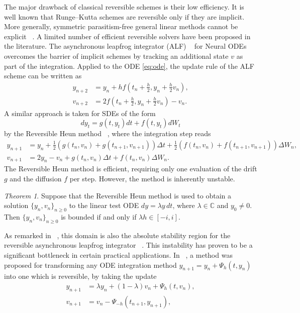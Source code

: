 \documentclass{article} %
\theoremstyle{definition}
\theoremstyle{remark}
\newtheorem{theorem}{Theorem}[section]
\begin{document}
The major drawback of classical reversible schemes is their low efficiency. It is well known that Runge--Kutta schemes are reversible only if they are implicit. More generally, symmetric parasitism-free general linear methods cannot be explicit ~\citep{butcher2016symmetric}. A limited number of efficient reversible solvers have been proposed in the literature. The asynchronous leapfrog integrator (ALF) ~\citep{zhuang2021mali} for Neural ODEs overcomes the barrier of implicit schemes by tracking an additional state $v$ as part of the integration. Applied to the ODE \eqref{eq:ode}, the update rule of the ALF scheme can be written as
\begin{align*}
    y_{n+2} &= y_n + h f\left(t_n + \frac{h}{2}, y_n + \frac{h}{2} v_n\right),\\
    v_{n+2} &=2f\left(t_n + \frac{h}{2}, y_n + \frac{h}{2} v_n\right) - v_n.
\end{align*}
A similar approach is taken for SDEs of the form
\begin{equation}\label{eq:sde}
    dy_t = g(t,y_t)dt + f(t,y_t)dW_t
\end{equation}
by the Reversible Heun method ~\citep{kidger2021efficient}, where the integration step reads
\begin{align*}
    y_{n+1} &= y_n + \frac{1}{2}(g(t_n, v_n) + g(t_{n+1}, v_{n+1})) \Delta t + \frac{1}{2}(f(t_n, v_n) + f(t_{n+1}, v_{n+1})) \Delta W_n,\\
    v_{n+1} &= 2y_n - v_n + g(t_n, v_n) \Delta t + f(t_n, v_n) \Delta W_n.
\end{align*}
The Reversible Heun method is efficient, requiring only one evaluation of the drift $g$ and the diffusion $f$ per step. However, the method is inherently unstable.

\begin{theorem}{\cite[Theorem D.19]{kidger2021efficient}}\label{thm:rev_heun_stability}
    Suppose that the Reversible Heun method is used to obtain a solution $\{y_n, v_n\}_{n \geq 0}$ to the linear test ODE $dy = \lambda y\, dt$, where $\lambda \in \mathbb{C}$ and $y_0 \neq 0$. Then $\{y_n, v_n\}_{n \geq 0}$ is bounded if and only if $\lambda h \in [-i, i]$.
\end{theorem}

As remarked in ~\cite{kidger2021efficient}, this domain is also the absolute stability region for the reversible asynchronous leapfrog integrator ~\citep{zhuang2021mali}. This instability has proven to be a significant bottleneck in certain practical applications. In ~\cite{mccallum2024efficient}, a method was proposed for transforming any ODE integration method $y_{n+1} = y_n + \Psi_h(t,y_n)$ into one which is reversible, by taking the update
\begin{align*}
    y_{n+1} &= \lambda y_n + (1-\lambda) v_n + \Psi_h(t,v_n),\\
    v_{n+1} &= v_n - \Psi_{-h}(t_{n+1}, y_{n+1}),
\end{align*}
\end{document}
